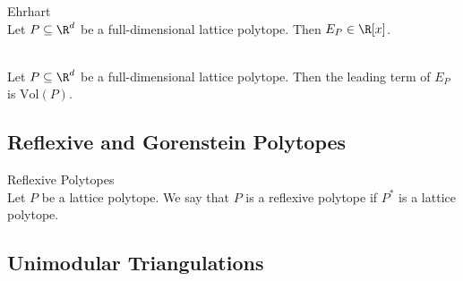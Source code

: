 \documentclass[a4paper]{article}
\begin{document}
\begin{thm}{Ehrhart}{}\\
Let $P\subseteq\R^d$ be a full-dimensional lattice polytope. Then $E_P\in\R[x]$. 
\end{thm}

\begin{lmm}{}{}\\
Let $P\subseteq\R^d$ be a full-dimensional lattice polytope. Then the leading term of $E_P$ is $\text{Vol}(P)$. 
\end{lmm}

\subsection{Reflexive and Gorenstein Polytopes}
\begin{defn}{Reflexive Polytopes}{}\\
Let $P$ be a lattice polytope. We say that $P$ is a reflexive polytope if $P^\ast$ is a lattice polytope. 
\end{defn}

\subsection{Unimodular Triangulations}
\end{document}
